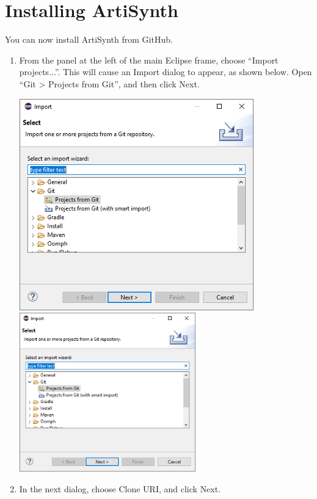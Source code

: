 \section{Installing ArtiSynth}

You can now install ArtiSynth from GitHub. 

\begin{enumerate}

\item From the panel at the left of the main Eclipse frame, choose
``{\sf Import projects...}''. This will cause an {\sf Import} dialog to
appear, as shown below. Open ``{\sf Git > Projects from Git}'', and then
click {\sf Next}.

\begin{center}
\iflatexml
   \includegraphics[]{images/EclipseImport}
\else
   \includegraphics[width=0.6\textwidth]{images/EclipseImport}
\fi
\end{center}

\item In the next dialog, choose {\sf Clone URI}, and click {\sf Next}.


\end{enumerate}
